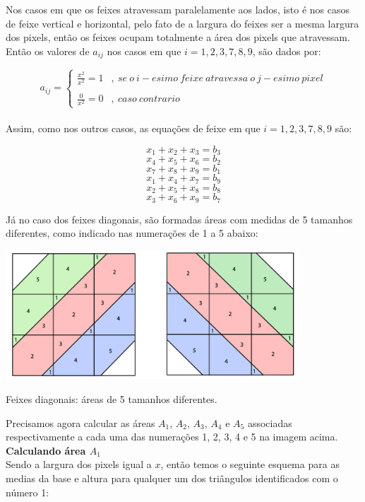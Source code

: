 \documentclass[a4paper, 12pt]{article}
\begin{document}
Nos casos em que os feixes atravessam paralelamente aos lados, isto é nos casos de feixe vertical e horizontal, pelo fato de a largura do feixes ser a mesma largura dos pixels, então os feixes ocupam totalmente a área dos pixels que atravessam. Então os valores de $a_{ij}$ nos casos em que $i=1, 2, 3, 7, 8, 9$, são dados por:

$$a_{ij}=\begin{cases}
\frac{x^2}{x^2}=1&{,}\ se\ o\ i-esimo\ feixe\ atravessa\ o\ j-esimo\ pixel\\
&\\
\frac{0}{x^2}=0&{,}\ caso\ contrario
\end{cases}$$\\

Assim, como nos outros casos, as equações de feixe em que $i=1, 2, 3, 7, 8, 9$ são:

$$x_1+x_2+x_3=b_3$$
$$x_4+x_5+x_6=b_2$$
$$x_7+x_8+x_9=b_1$$
$$x_1+x_4+x_7=b_9$$
$$x_2+x_5+x_8=b_8$$
$$x_3+x_6+x_9=b_7$$

Já no caso dos feixes diagonais, são formadas áreas com medidas de 5 tamanhos diferentes, como indicado nas numerações de 1 a 5 abaixo:

\begin{center}
    \includegraphics[width=11cm]{05_areas_diagonais.fw.png}
    
    Feixes diagonais: áreas de 5 tamanhos diferentes.
\end{center}

Precisamos agora calcular as áreas $A_1$, $A_2$, $A_3$, $A_4$ e $A_5$ associadas respectivamente a cada uma das numerações 1, 2, 3, 4 e 5 na imagem acima.\\

\textbf{Calculando área $A_1$}\\

Sendo a largura dos pixels igual a $x$, então temos o seguinte esquema para as medias da base e altura para qualquer um dos triângulos identificados com o número 1:
\end{document}

